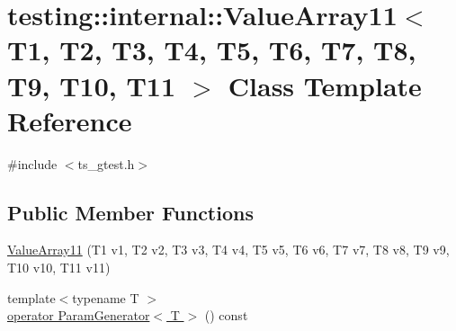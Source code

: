\hypertarget{classtesting_1_1internal_1_1ValueArray11}{\section{testing\-:\-:internal\-:\-:Value\-Array11$<$ T1, T2, T3, T4, T5, T6, T7, T8, T9, T10, T11 $>$ Class Template Reference}
\label{classtesting_1_1internal_1_1ValueArray11}
}


{\ttfamily \#include $<$ts\-\_\-gtest.\-h$>$}

\subsection*{Public Member Functions}
\begin{DoxyCompactItemize}
\item 
\hyperlink{classtesting_1_1internal_1_1ValueArray11_a2b26f49e7c5856e86f4fae360cd22d47}{Value\-Array11} (T1 v1, T2 v2, T3 v3, T4 v4, T5 v5, T6 v6, T7 v7, T8 v8, T9 v9, T10 v10, T11 v11)
\item 
{\footnotesize template$<$typename T $>$ }\\\hyperlink{classtesting_1_1internal_1_1ValueArray11_a39b9a36841b587e5be267cb33181f003}{operator Param\-Generator$<$ T $>$} () const 
\end{DoxyCompactItemize}


